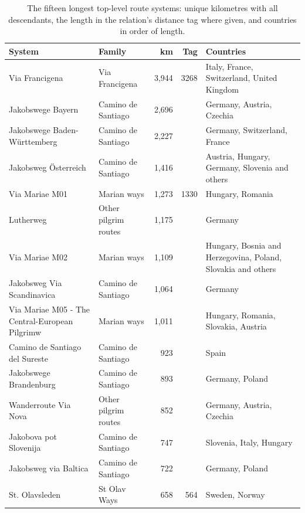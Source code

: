 \documentclass[11pt,a4paper]{article}
\begin{document}
\begin{table}[tbp]\centering\footnotesize\setlength{\tabcolsep}{4pt}\caption{The fifteen longest top-level route systems: unique kilometres with all descendants, the length in the relation's distance tag where given, and countries in order of length.}\label{tab:longest}\begin{tabular}{p{4.6cm}p{2.6cm}rrp{4.4cm}}\toprule System & Family & km & Tag & Countries\\\midrule
Via Francigena & Via Francigena & 3,944 & 3268 & Italy, France, Switzerland, United Kingdom\\
Jakobswege Bayern & Camino de Santiago & 2,696 &  & Germany, Austria, Czechia\\
Jakobswege Baden-Württemberg & Camino de Santiago & 2,227 &  & Germany, Switzerland, France\\
Jakobsweg Österreich & Camino de Santiago & 1,416 &  & Austria, Hungary, Germany, Slovenia and others\\
Via Mariae M01 & Marian ways & 1,273 & 1330 & Hungary, Romania\\
Lutherweg & Other pilgrim routes & 1,175 &  & Germany\\
Via Mariae M02 & Marian ways & 1,109 &  & Hungary, Bosnia and Herzegovina, Poland, Slovakia and others\\
Jakobsweg Via Scandinavica & Camino de Santiago & 1,064 &  & Germany\\
Via Mariae M05 - The Central-European Pilgrimw & Marian ways & 1,011 &  & Hungary, Romania, Slovakia, Austria\\
Camino de Santiago del Sureste & Camino de Santiago & 923 &  & Spain\\
Jakobswege Brandenburg & Camino de Santiago & 893 &  & Germany, Poland\\
Wanderroute Via Nova & Other pilgrim routes & 852 &  & Germany, Austria, Czechia\\
Jakobova pot Slovenija & Camino de Santiago & 747 &  & Slovenia, Italy, Hungary\\
Jakobsweg via Baltica & Camino de Santiago & 722 &  & Germany, Poland\\
St. Olavsleden & St Olav Ways & 658 & 564 & Sweden, Norway\\
\bottomrule\end{tabular}\end{table}
\end{document}
